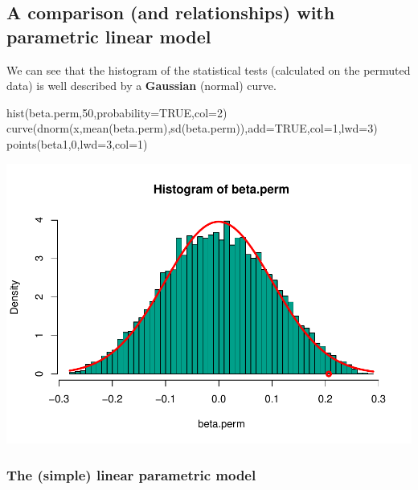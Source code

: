 \documentclass[
]{article}
\newenvironment{Shaded}{\begin{snugshade}}{\end{snugshade}}
\newcommand{\AttributeTok}[1]{\textcolor[rgb]{0.77,0.63,0.00}{#1}}
\newcommand{\ConstantTok}[1]{\textcolor[rgb]{0.00,0.00,0.00}{#1}}
\newcommand{\DecValTok}[1]{\textcolor[rgb]{0.00,0.00,0.81}{#1}}
\newcommand{\FunctionTok}[1]{\textcolor[rgb]{0.00,0.00,0.00}{#1}}
\newcommand{\NormalTok}[1]{#1}
\begin{document}
\hypertarget{a-comparison-and-relationships-with-parametric-linear-model}{%
\subsection{A comparison (and relationships) with parametric linear
model}\label{a-comparison-and-relationships-with-parametric-linear-model}}

We can see that the histogram of the statistical tests (calculated on
the permuted data) is well described by a \textbf{Gaussian }(normal)
curve.

\begin{Shaded}
\begin{Highlighting}[]
\FunctionTok{hist}\NormalTok{(beta.perm,}\DecValTok{50}\NormalTok{,}\AttributeTok{probability=}\ConstantTok{TRUE}\NormalTok{,}\AttributeTok{col=}\DecValTok{2}\NormalTok{)}
\FunctionTok{curve}\NormalTok{(}\FunctionTok{dnorm}\NormalTok{(x,}\FunctionTok{mean}\NormalTok{(beta.perm),}\FunctionTok{sd}\NormalTok{(beta.perm)),}\AttributeTok{add=}\ConstantTok{TRUE}\NormalTok{,}\AttributeTok{col=}\DecValTok{1}\NormalTok{,}\AttributeTok{lwd=}\DecValTok{3}\NormalTok{)}
\FunctionTok{points}\NormalTok{(beta1,}\DecValTok{0}\NormalTok{,}\AttributeTok{lwd=}\DecValTok{3}\NormalTok{,}\AttributeTok{col=}\DecValTok{1}\NormalTok{)}
\end{Highlighting}
\end{Shaded}

\begin{center}\includegraphics{perm_files/figure-latex/unnamed-chunk-18-1} \end{center}

\hypertarget{the-simple-linear-parametric-model}{%
\subsubsection{The (simple) linear parametric
model}\label{the-simple-linear-parametric-model}}
\end{document}
